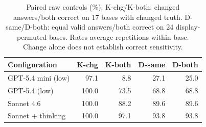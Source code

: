 \begin{table}[t]
\centering
\small
\setlength{\tabcolsep}{3pt}
\begin{tabular}{lrrrr}
\toprule
Configuration & K-chg & K-both & D-same & D-both \\
\midrule
GPT-5.4 mini (low) & 97.1 & 8.8 & 27.1 & 25.0 \\
GPT-5.4 (low) & 100.0 & 73.5 & 68.8 & 68.8 \\
Sonnet 4.6 & 100.0 & 88.2 & 89.6 & 89.6 \\
Sonnet + thinking & 100.0 & 97.1 & 93.8 & 93.8 \\
\bottomrule
\end{tabular}
\caption{Paired raw controls (\%). K-chg/K-both: changed answers/both correct on 17 bases with changed truth. D-same/D-both: equal valid answers/both correct on 24 display-permuted bases. Rates average repetitions within base. Change alone does not establish correct sensitivity.}
\label{tab:controls}
\end{table}
